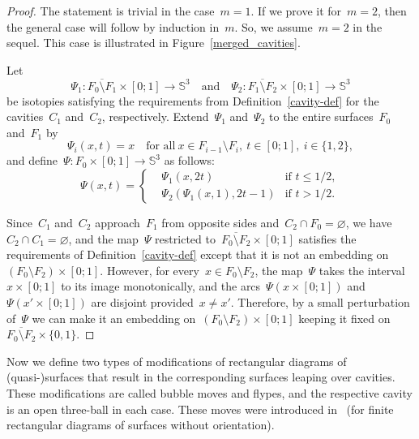 \documentclass{amsart}
\theoremstyle{theorem}
\theoremstyle{remark}
\theoremstyle{definition}
\numberwithin{equation}{section}
\numberwithin{figure}{section}
\begin{document}
\begin{proof}
The statement is trivial in the case~$m=1$. If we prove it for~$m=2$, then the general case will follow by induction in~$m$.
So, we assume~$m=2$ in the sequel. This case is illustrated in Figure~\ref{merged_cavities}.

Let
$$\Psi_1:\overline{F_0\setminus F_1}\times[0;1]\rightarrow\mathbb S^3\quad
\text{and}\quad
\Psi_2:\overline{F_1\setminus F_2}\times[0;1]\rightarrow\mathbb S^3$$
be isotopies satisfying the requirements from Definition~\ref{cavity-def} for the cavities~$C_1$ and~$C_2$,
respectively. Extend~$\Psi_1$ and~$\Psi_2$ to the entire surfaces~$F_0$ and~$F_1$ by
$$\Psi_i(x,t)=x\quad\text{for all}\ x\in F_{i-1}\setminus F_i,\ t\in[0;1],\ i\in\{1,2\},$$
and define~$\Psi:F_0\times[0;1]\rightarrow\mathbb S^3$ as follows:
$$\Psi(x,t)=\left\{\begin{aligned}
&\Psi_1(x,2t)&\text{if }t\leqslant1/2,\\
&\Psi_2(\Psi_1(x,1),2t-1)&\text{if }t>1/2.
\end{aligned}\right.$$

Since~$C_1$ and~$C_2$ approach~$F_1$ from opposite sides and~$C_2\cap F_0=\varnothing$,
we have~$C_2\cap C_1=\varnothing$, and the map~$\Psi$ restricted to~$\overline{F_0\setminus F_2}\times[0;1]$ satisfies
the requirements of Definition~\ref{cavity-def} except that it is not an embedding on~$(F_0\setminus F_2)\times[0;1]$.
However, for every~$x\in F_0\setminus F_2$, the map~$\Psi$ takes the interval~$x\times[0;1]$
to its image monotonically, and the arcs~$\Psi(x\times[0;1])$ and~$\Psi(x'\times[0;1])$ are disjoint provided~$x\ne x'$.
Therefore, by a small perturbation of~$\Psi$ we can make it an embedding on~$(F_0\setminus F_2)\times[0;1]$
keeping it fixed on~$\overline{F_0\setminus F_2}\times\{0,1\}$.
\end{proof}

Now we define two types of modifications of rectangular diagrams of (quasi-)surfaces
that result in the corresponding surfaces leaping over cavities. These modifications
are called bubble moves and flypes, and the respective cavity is an open three-ball in each case.
These moves were introduced in~\cite{Distinguishing,Basic_moves} (for finite rectangular diagrams of surfaces without orientation).
\end{document}
